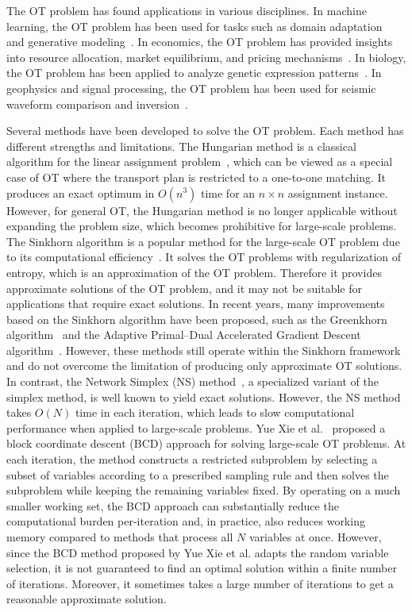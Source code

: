 \documentclass[12pt,a4paper]{article}
\begin{document}
The OT problem has found applications in various disciplines. In machine learning, the OT problem has been used for tasks such as domain adaptation~\cite{courty2016optimal} and generative modeling~\cite{arjovsky2017wasserstein}. In economics, the OT problem has provided insights into resource allocation, market equilibrium, and pricing mechanisms~\cite{galichon2016optimal}. In biology, the OT problem has been applied to analyze genetic expression patterns~\cite{schiebinger2019optimal}. In geophysics and signal processing, the OT problem has been used for seismic waveform comparison and inversion~\cite{liao2022fast}.


Several methods have been developed to solve the OT problem. Each method has different strengths and limitations. 
The Hungarian method is a classical algorithm for the linear assignment problem~\cite{kuhn1955hungarian},
which can be viewed as a special case of OT where the transport plan is restricted to a one-to-one matching.
It produces an exact optimum in $O(n^3)$ time for an $n\times n$ assignment instance.
However, for general OT, the Hungarian method is no longer applicable without
expanding the problem size, which becomes prohibitive for large-scale problems.
The Sinkhorn algorithm is a popular method for the large-scale OT problem due to its computational efficiency~\cite{cuturi2013sinkhorn}. It solves the OT problems with regularization of entropy, which is an approximation of the OT problem. Therefore it provides approximate solutions of the OT problem, and it may not be suitable for applications that require exact solutions. In recent years, many improvements based on the Sinkhorn algorithm have been proposed, such as the Greenkhorn algorithm~\cite{altschuler2017near} and the Adaptive Primal–Dual Accelerated Gradient Descent algorithm~\cite{dvurechensky2018computational}. However, these methods still operate within the Sinkhorn framework and do not overcome the limitation of producing only approximate OT solutions.
In contrast, the Network Simplex (NS) method~\cite{grigoriadis1986efficient}, a specialized variant of the simplex method, is well known to yield exact solutions. However, the NS method takes \(O(N)\) time in each iteration, which leads to slow computational performance when applied to large-scale problems.
Yue Xie et al.~\cite{xie2023randomized} proposed a block coordinate descent (BCD) approach for solving large-scale OT problems.
At each iteration, the method constructs a restricted subproblem by selecting a subset of variables according to a prescribed sampling rule and then solves the subproblem while keeping the remaining variables fixed.
By operating on a much smaller working set, the BCD approach can substantially reduce the computational burden per-iteration and, in practice, also reduces working memory compared to methods that process all $N$ variables at once.
However, since the BCD method proposed by Yue Xie et al. adapts the random variable selection, it is not guaranteed to find an optimal solution within a finite number of iterations. Moreover, it sometimes takes a large number of iterations to get a reasonable approximate solution.
\end{document}
